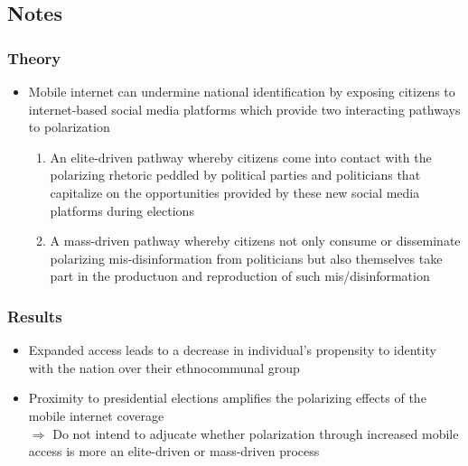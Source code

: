 \documentclass[11pt]{article}
\begin{document}
\subsection{Notes}
\subsubsection*{Theory}
\begin{itemize}
    \item Mobile internet can undermine national identification by exposing citizens to internet-based social media platforms which provide two interacting pathways to polarization
    \begin{enumerate}
        \item An elite-driven pathway whereby citizens come into contact with the polarizing rhetoric peddled by political parties and politicians that capitalize on the opportunities provided by these new social media platforms during elections
        \item A mass-driven pathway whereby citizens not only consume or disseminate polarizing mis-disinformation from politicians but also themselves take part in the productuon and reproduction of such mis/disinformation
    \end{enumerate}
\end{itemize}
\subsubsection*{Results}
\begin{itemize}
    \item Expanded access leads to a decrease in individual's propensity to identity with the nation over their ethnocommunal group
    \item Proximity to presidential elections amplifies the polarizing effects of the mobile internet coverage
\\
$\Rightarrow$ Do not intend to adjucate whether polarization through increased mobile access is more an elite-driven or mass-driven process

\end{itemize}
\end{document}
